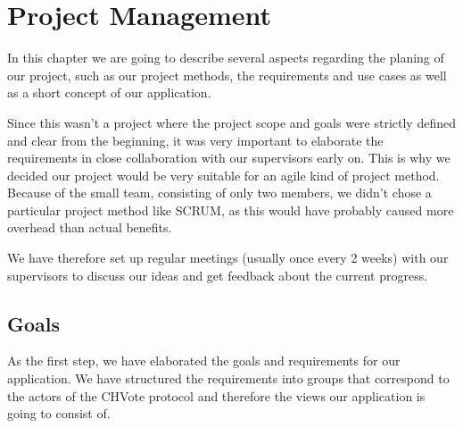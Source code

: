 
\newcommand{\zs}[0]{\cellcolor{zscol}}				%
\newcommand{\zi}[0]{\cellcolor{zicol}}				%
\newcommand{\ms}[1]{
	\makebox[.7cm][r]{
		\tikz[baseline=(char.base)]{
			\node[shape=circle,draw,inner sep=.02cm,fill=black,text=white] (char) { #1 };
		}
	}
}

\newcommand{\sq}[1]{\textcolor{#1}{\rule{.3cm}{.3cm}}}

\newcommand{\phase}[1]{
	\multicolumn{22}{l}{} \\
	\multicolumn{22}{l}{\cellcolor{gray!20}\textbf{#1}} \\ \hline
}

\chapter{Project Management}
In this chapter we are going to describe several aspects regarding the planing of our project, such as our project methods, the requirements and use cases as well as a short concept of our application.

Since this wasn't a project where the project scope and goals were strictly defined and clear from the beginning, it was very important to elaborate the requirements in close collaboration with our supervisors early on. This is why we decided our project would be very suitable for an agile kind of project method. Because of the small team, consisting of only two members, we didn't chose a particular project method like SCRUM, as this would have probably caused more overhead than actual benefits.

We have therefore set up regular meetings (usually once every 2 weeks) with our supervisors to discuss our ideas and get feedback about the current progress.

\section{Goals}
As the first step, we have elaborated the goals and requirements for our application. We have structured the requirements into groups that correspond to the actors of the CHVote protocol and therefore the views our application is going to consist of.

